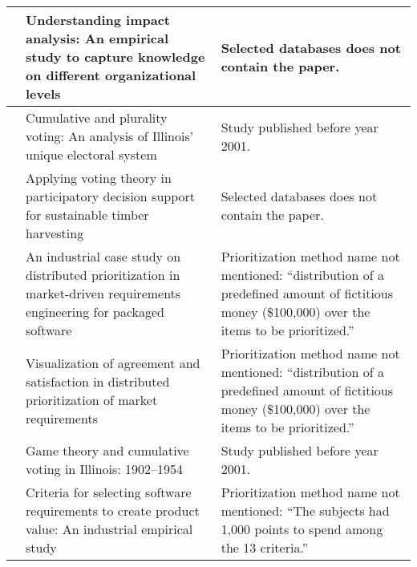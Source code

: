 {\begin{tabular}{
|>{\raggedright}p{}
|>{\raggedright}p{}
|>{\raggedright}p{}
|}
\cite{Jonsson2005a} & Understanding impact analysis: An empirical study to capture knowledge on different organizational levels &
Selected databases does not contain the paper.
\tabularnewline \hline

\cite{Kuklinski1973} & Cumulative and plurality voting: An analysis of Illinois' unique electoral system &
Study published before year 2001.
\tabularnewline \hline

\cite{Laukkanen2004} & Applying voting theory in participatory decision support for sustainable timber harvesting &
Selected databases does not contain the paper.
\tabularnewline \hline

\cite{Regnell2001} & An industrial case study on distributed prioritization in market-driven requirements engineering for packaged software &
Prioritization method name not mentioned: ``distribution of a predefined amount of fictitious money (\$100,000) over the items to be prioritized.''
\tabularnewline \hline

\cite{Regnell2000} & Visualization of agreement and satisfaction in distributed prioritization of market requirements &
Prioritization method name not mentioned: ``distribution of a predefined amount of fictitious money (\$100,000) over the items to be prioritized.''
\tabularnewline \hline

\cite{Sawyer1962} & Game theory and cumulative voting in Illinois: 1902--1954 &
Study published before year 2001.
\tabularnewline \hline

\cite{Wohlin2006} & Criteria for selecting software requirements to create product value: An industrial empirical study &
Prioritization method name not mentioned: ``The subjects had 1,000 points to spend among the 13 criteria.''
\tabularnewline \hline

\end{tabular}
}
